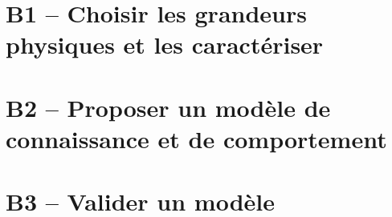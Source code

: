 \proffalse

\section{B1 -- Choisir les grandeurs physiques et les caractériser}

\section{B2 -- Proposer un modèle de connaissance et de comportement}
\begin{multicols}{2}












\end{multicols}

\section{B3 -- Valider un modèle}


%
%
%
%
%
%
%
%
%
%
%
%
